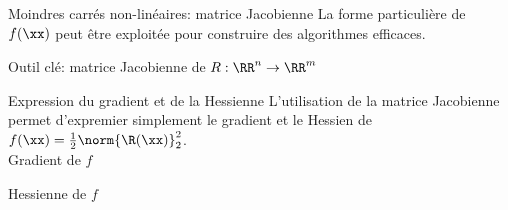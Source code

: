 \documentclass[9pt,table]{beamer} %
\begin{document}
\begin{frame}{Moindres carrés non-linéaires: matrice Jacobienne}
  La forme particulière de $f(\xx)$ peut être exploitée pour construire des algorithmes efficaces. \bigskip


  \alert{Outil clé: matrice Jacobienne de $R: \RR^n \rightarrow \RR^m$}

\end{frame}



\begin{frame}{Expression du gradient et de la Hessienne}
  L'utilisation de la matrice Jacobienne permet d'expremier simplement le gradient et le Hessien de $f(\xx) = \frac{1}{2}\norm{ \R(\xx)}^2_2$. \\[1em]

  \alert{Gradient de $f$}

  
  \alert{Hessienne de $f$}
\end{frame}
\end{document}
